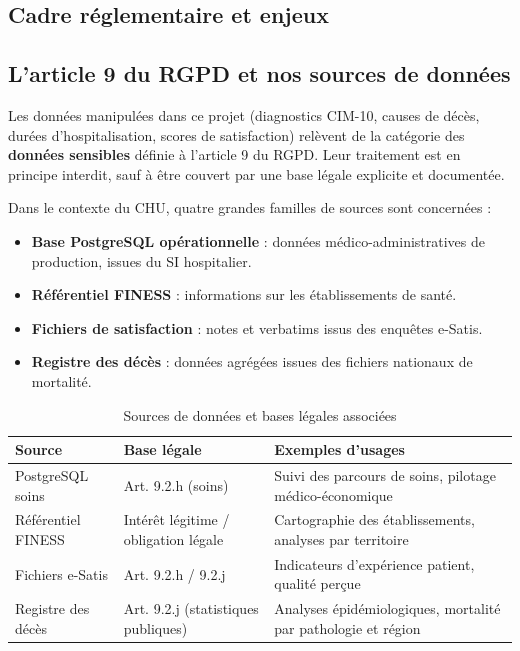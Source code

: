 \documentclass[12pt, a4paper]{report}
\begin{document}
\begin{itemize}[label=\textcolor{chuBlue}{\textbullet}]
\section{Cadre réglementaire et enjeux}

\subsection{L'article 9 du RGPD et nos sources de données}

Les données manipulées dans ce projet (diagnostics CIM-10, causes de décès, durées d'hospitalisation, scores de satisfaction) relèvent de la catégorie des \textbf{données sensibles} définie à l'article 9 du RGPD. Leur traitement est en principe interdit, sauf à être couvert par une base légale explicite et documentée.

Dans le contexte du CHU, quatre grandes familles de sources sont concernées :

\begin{itemize}[label=\textcolor{chuBlue}{\textbullet}]
  \item \textbf{Base PostgreSQL opérationnelle} : données médico-administratives de production, issues du SI hospitalier.
  \item \textbf{Référentiel FINESS} : informations sur les établissements de santé.
  \item \textbf{Fichiers de satisfaction} : notes et verbatims issus des enquêtes e-Satis.
  \item \textbf{Registre des décès} : données agrégées issues des fichiers nationaux de mortalité.
\end{itemize}

\begin{table}[htbp]
\centering\footnotesize\renewcommand{\arraystretch}{1.5}
\begin{tabularx}{\linewidth}{@{} L{3.0cm} L{3.2cm} X @{}}
\toprule
{}
\textbf{Source} & \textbf{Base légale} & \textbf{Exemples d'usages} \\
\midrule
PostgreSQL soins &
Art. 9.2.h (soins) &
Suivi des parcours de soins, pilotage médico-économique \\
Référentiel FINESS &
Intérêt légitime / obligation légale &
Cartographie des établissements, analyses par territoire \\
Fichiers e-Satis &
Art. 9.2.h / 9.2.j &
Indicateurs d'expérience patient, qualité perçue \\
Registre des décès &
Art. 9.2.j (statistiques publiques) &
Analyses épidémiologiques, mortalité par pathologie et région \\
\bottomrule
\end{tabularx}
\caption{Sources de données et bases légales associées}
\label{tab:rgpd_sources}
\end{table}


\end{itemize}
\end{document}

